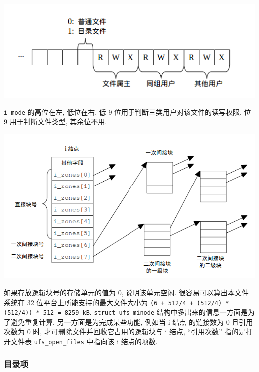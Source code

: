\documentclass[nofonts, titlepage]{ctexart}
\begin{document}
\begin{center}
\includegraphics[width=15cm]{./images/./imode.png}
\label{fig:i_mode}
\end{center}

\texttt{i\_mode} 的高位在左, 低位在右. 低 9
位用于判断三类用户对该文件的读写权限, 位 9 用于判断文件类型, 其余位不用.

\begin{center}
\includegraphics[width=15cm]{./images/./i_zones_array.png}
\label{fig:i_node}
\end{center}

如果存放逻辑块号的存储单元的值为 0, 说明该单元空闲.
很容易可以算出本文件系统在 32 位平台上所能支持的最大文件大小为
\texttt{(6 + 512/4 + (512/4) * (512/4)) * 512 = 8259 kB}.
\texttt{struct ufs\_minode} 结构中多出来的信息一方面是为了避免重复计算,
另一方面是为完成某些功能, 例如当 i 结点 的链接数为 0 且引用次数为 0 时,
才可删除文件并回收它占用的逻辑块与 i 结点, ``引用次数'' 指的是打开文件表
\texttt{ufs\_open\_files} 中指向该 i 结点的项数.

\subsubsection{目录项}\label{ux76eeux5f55ux9879}
\end{document}
